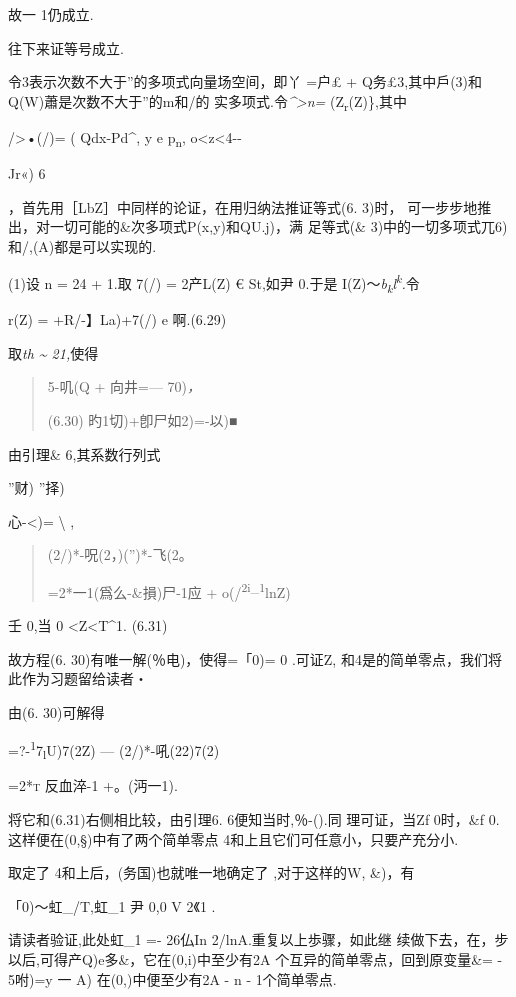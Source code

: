 \documentclass{article}
\begin{document}
故一 1仍成立.

往下来证等号成立.

令3表示次数不大于''的多项式向量场空间，即丫 =户£ +
Q务£3,其中戶(3)和Q(W)蕭是次数不大于''的m和/的
实多项式.令\emph{\^{}\textgreater{}n=} (Z\textsubscript{r}(Z)\},其中

/\textgreater{}•(/)= ( Qdx-Pd\^{}, y e p\textsubscript{n},
o\textless{}z\textless{}4-\/-

Jr«) 6

，首先用［LbZ］中同样的论证，在用归纳法推证等式(6. 3)时，
可一步步地推出，对一切可能的\&次多项式P(x,y)和QU.j)，满 足等式(\&
3)中的一切多项式兀6)和/,(A)都是可以实现的.

(1)设 n = 24 + 1.取 7(/) = 2产L(Z) € St,如尹 0.于是
I(Z)〜\emph{b\textsubscript{k}l\textsuperscript{k}.}令

r(Z) = +R/-】La)+7(/) e 啊.(6.29)

取\emph{th \textasciitilde{} 21,}使得

\begin{quote}
5-叽(Q + 向井=--- 70)\emph{，}

(6.30) 旳1切)+卽尸如2)=-以)■
\end{quote}

由引理\& 6,其系数行列式

''财) ''择)

心-\textless{})= \textbackslash{} ,

\begin{quote}
(2/)*-呪(2，)('')*-飞(2。

=2*一1(爲么-\&損)尸-1应 + o(/\textsuperscript{2i\_1}lnZ)
\end{quote}

壬 0,当 0 \textless{}Z\textless{}T\^{}1. (6.31)

故方程(6. 30)有唯一解(％电)，使得=「0)= 0 .可证Z,
和4是的简单零点，我们将此作为习题留给读者・

由(6. 30)可解得

=?-\textsuperscript{1}7\textsubscript{l}U)7(2Z) --- (2/)*-吼(22)7(2)

\textsc{=2*t} 反血淬-1 +。(沔一1).

将它和(6.31)右侧相比较，由引理6. 6便知当时,％-().同 理可证，当Zf
0时，\&f 0.这样便在(0,§)中有了两个简单零点
4和上且它们可任意小，只要产充分小.

取定了 4和上后，(务国)也就唯一地确定了 ,对于这样的W, \&)，有

「0)〜虹\_/T,虹\_1 尹 0,0 V 2《1 .

请读者验证,此处虹\_1 =- 26仏In 2/lnA.重复以上歩骤，如此继
续做下去，在，步以后,可得产Q)e多\&，它在(0,i)中至少有2A
个互异的简单零点，回到原变量\&=\textbar{} - 5咐)=y 一 A)
在(0,\textbar{})中便至少有2A - n - 1个简单零点.
\end{document}
